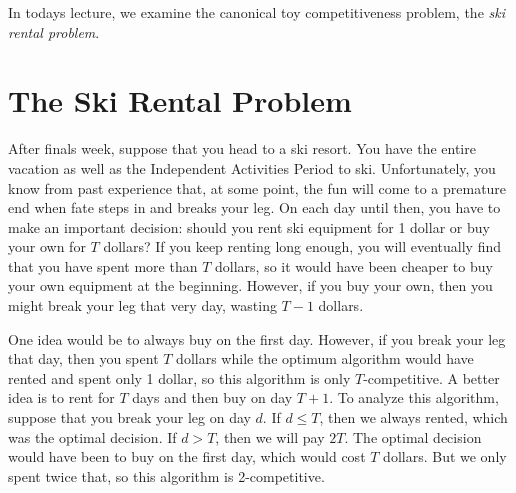 \documentclass{article}
\begin{document}
In todays lecture, we examine the canonical toy competitiveness problem,
the \emph{ski rental problem}.

\section{The Ski Rental Problem}

After finals week, suppose that you head to a ski resort. You have
the entire vacation as well as the Independent Activities Period
to ski. Unfortunately, you know from past experience that, at some
point, the fun will come to a premature end when fate steps in and
breaks your leg. On each day until then, you have to make an
important decision: should you rent ski equipment for 1 dollar or
buy your own for $T$ dollars? If you keep renting long enough, you
will eventually find that you have spent more than $T$ dollars, so
it would have been cheaper to buy your own equipment at the
beginning. However, if you buy your own, then you might break your
leg that very day, wasting $T-1$ dollars.

One idea would be to always buy on the first day. However, if you
break your leg that day, then you spent $T$ dollars while the
optimum algorithm would have rented and spent only 1 dollar, so
this algorithm is only $T$-competitive. A better idea is to rent
for $T$ days and then buy on day $T+1$. To analyze this algorithm,
suppose that you break your leg on day $d$. If $d\leq T$, then we
always rented, which was the optimal decision. If $d>T$, then we
will pay $2T$. The optimal decision would have been to buy on the
first day, which would cost $T$ dollars. But we only spent twice
that, so this algorithm is 2-competitive.
\end{document}
